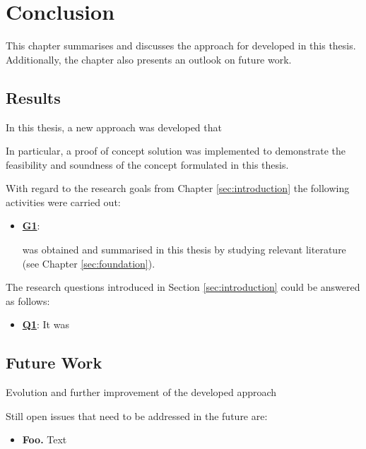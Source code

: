 \section{Conclusion\label{sec:conclusion}}

This chapter summarises and discusses the  approach for developed in this thesis. Additionally, the chapter also presents an outlook on future work.

\subsection{Results}

In this thesis, a new approach was developed that 

In particular, a
proof of concept solution was implemented to demonstrate the feasibility and soundness of the
concept formulated in this thesis.

With regard to the research goals from Chapter \ref{sec:introduction} the following activities
were carried out:

\begin{itemize}
    \item \hyperref[G1]{\textbf{G1}}: 
    
    was obtained and summarised in this
      thesis by studying relevant literature (see Chapter \ref{sec:foundation}).


\end{itemize}

\clearpage
The research questions introduced in Section \ref{sec:introduction} could be answered as follows:

\begin{itemize}

  \item \hyperref[Q1]{\textbf{Q1}}: It was 

\end{itemize}

 
\subsection{Future Work}

Evolution and further improvement of the developed approach 

Still open issues that need to be addressed in the future are:
\begin{itemize}
    \item \textbf{Foo.} Text
\end{itemize}

